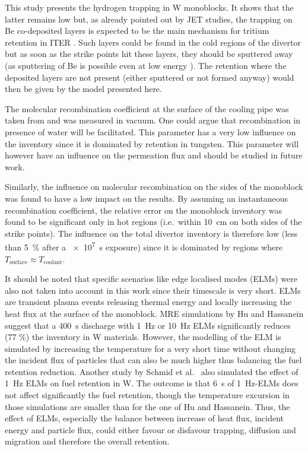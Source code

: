 This study presents the hydrogen trapping in W monoblocks.
It shows that the latter remains low but, as already pointed out by JET studies, the trapping on Be co-deposited layers is expected to be the main mechanism for tritium retention in ITER .
Such layers could be found in the cold regions of the divertor but as soon as the strike points hit these layers, they should be sputtered away (as sputtering of Be is possible even at low energy \cite{bjorkas_variables_2013, brezinsek_beryllium_2015}).
The retention where the deposited layers are not present (either sputtered or not formed anyway) would then be given by the model presented here.

The molecular recombination coefficient at the surface of the cooling pipe was taken from  and was measured in vacuum.
One could argue that recombination in presence of water will be facilitated.
This parameter has a very low influence on the inventory since it is dominated by retention in tungsten.
This parameter will however have an influence on the permeation flux and should be studied in future work.

Similarly, the influence on molecular recombination on the sides of the monoblock was found to have a low impact on the results.
By assuming an instantaneous recombination coefficient, the relative error on the monoblock inventory was found to be significant only in hot regions (i.e.\ within \SI{10}{cm} on both sides of the strike points).
The influence on the total divertor inventory is therefore low (less than \SI{5}{\%} after a \SI{e7}{s} exposure) since it is dominated by regions where $T_\mathrm{surface} \approx T_\mathrm{coolant}$.

It should be noted that specific scenarios like edge localised modes (ELMs) were also not taken into account in this work since their timescale is very short.
ELMs are transient plasma events releasing thermal energy and locally increasing the heat flux at the surface of the monoblock.
MRE simulations by Hu and Hassanein  suggest that a \SI{400}{s} discharge with \SI{1}{Hz} or \SI{10}{Hz} ELMs significantly reduces (77 \%) the inventory in W materials.
However, the modelling of the ELM is simulated by increasing the temperature for a very short time without changing the incident flux of particles that can also be much higher thus balancing the fuel retention reduction.
Another study by Schmid et al.\  also simulated the effect of \SI{1}{Hz} ELMs on fuel retention in W.
The outcome is that \SI{6}{s} of \SI{1}{Hz}-ELMs does not affect significantly the fuel retention, though the temperature excursion in those simulations are smaller than for the one of Hu and Hassanein.
Thus, the effect of ELMs, especially the balance between increase of heat flux, incident energy and particle flux, could either favour or disfavour trapping, diffusion and migration and therefore the overall retention.
  
